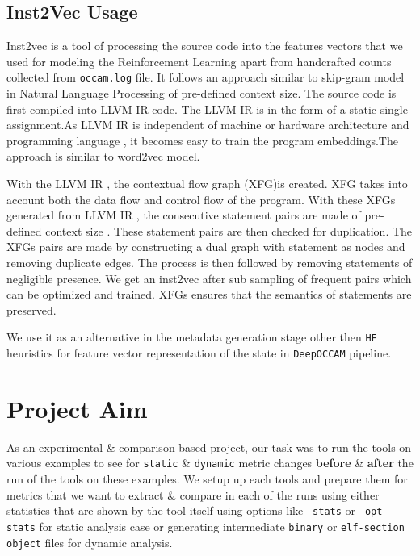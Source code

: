 \documentclass{relatorio}
\begin{document}
\subsection{Inst2Vec Usage}%
\label{Tools}

Inst2vec is a tool of processing the source code into the features vectors that we used for modeling the Reinforcement Learning apart from handcrafted counts collected from \texttt{occam.log} file. It follows an approach similar to skip-gram model in Natural Language Processing of pre-defined context size. The source code is first compiled into LLVM IR code. The LLVM IR is in the form of a static single assignment.As LLVM IR  is independent of machine or hardware architecture and programming language , it becomes easy to train the program embeddings.The approach is similar to word2vec model.

With the LLVM IR , the contextual flow graph (XFG)is created. XFG takes into account both the data flow and control flow of the program. With these XFGs generated from LLVM IR , the consecutive statement pairs are made of pre-defined context size . These statement pairs are then  checked for duplication. The XFGs pairs are made by constructing a dual graph with statement as nodes and removing duplicate edges. The process is then followed by removing statements of negligible presence. We get an inst2vec after sub sampling of frequent pairs which can be optimized and trained. XFGs ensures that the semantics of statements are preserved.

We use it as an alternative in the metadata generation stage other then \texttt{HF} heuristics for feature vector
representation of the state in \texttt{DeepOCCAM} pipeline. 

\section{Project Aim}%
\label{Tools}

As an experimental \& comparison based project, our task was to run the tools on various examples to see for \texttt{static} 
\& \texttt{dynamic} metric changes \textbf{before} \& \textbf{after} the run of the tools on these examples. 
We setup up each tools and prepare them for metrics that we want to extract \& compare in each of the runs using either 
statistics that are shown by the tool itself using options like \texttt{--stats} or \texttt{--opt-stats} for static analysis case 
or generating intermediate \texttt{binary} or \texttt{elf-section object} files for dynamic analysis.
\end{document}
